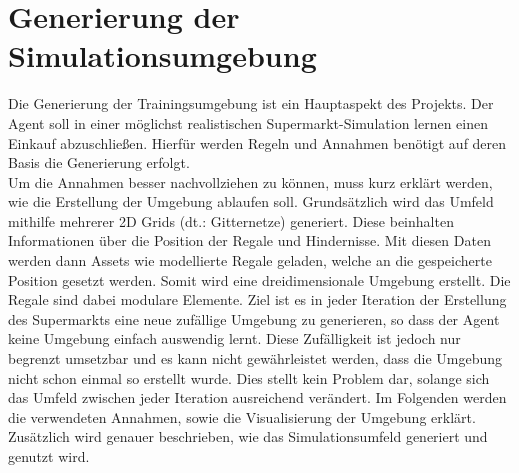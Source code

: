 \newpage
\section{Generierung der Simulationsumgebung}
\label{generierung_sim}
Die Generierung der Trainingsumgebung ist ein Hauptaspekt des Projekts. Der Agent soll in einer möglichst realistischen Supermarkt-Simulation lernen einen Einkauf abzuschließen. Hierfür werden Regeln und Annahmen benötigt auf deren Basis die Generierung erfolgt. 
\\
Um die Annahmen besser nachvollziehen zu können, muss kurz erklärt werden, wie die Erstellung der Umgebung ablaufen soll. Grundsätzlich wird das Umfeld mithilfe mehrerer 2D Grids (dt.: Gitternetze) generiert. Diese beinhalten Informationen über die Position der Regale und Hindernisse. Mit diesen Daten werden dann Assets wie modellierte Regale geladen, welche an die gespeicherte Position gesetzt werden. Somit wird eine dreidimensionale Umgebung erstellt. Die Regale sind dabei modulare Elemente. Ziel ist es in jeder Iteration der Erstellung des Supermarkts eine neue zufällige Umgebung zu generieren, so dass der Agent keine Umgebung einfach auswendig lernt. Diese Zufälligkeit ist jedoch nur begrenzt umsetzbar und es kann nicht gewährleistet werden, dass die Umgebung nicht schon einmal so erstellt wurde. Dies stellt kein Problem dar, solange sich das Umfeld zwischen jeder Iteration ausreichend verändert. 
Im Folgenden werden die verwendeten Annahmen, sowie die Visualisierung der Umgebung erklärt. Zusätzlich wird genauer beschrieben, wie das Simulationsumfeld generiert und genutzt wird.

